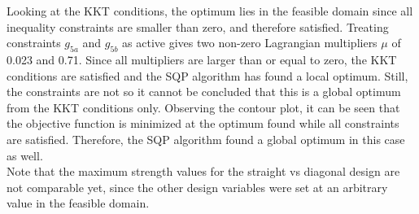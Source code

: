 Looking at the KKT conditions, the optimum lies in the feasible domain since all inequality constraints are smaller than zero, and therefore satisfied. Treating constraints $g_{5a}$ and $g_{5b}$ as active gives two non-zero Lagrangian multipliers $\mu$ of 0.023 and 0.71. Since all multipliers are larger than or equal to zero, the KKT conditions are satisfied and the SQP algorithm has found a local optimum. Still, the constraints are not  so it cannot be concluded that this is a global optimum from the KKT conditions only. Observing the contour plot, it can be seen that the objective function is minimized at the optimum found while all constraints are satisfied. Therefore, the SQP algorithm found a global optimum in this case as well.\\

Note that the maximum strength values for the straight vs diagonal design are not comparable yet, since the other design variables were set at an arbitrary value in the feasible domain.








